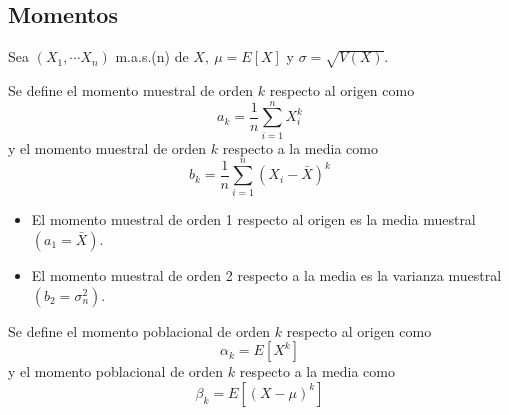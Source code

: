 \subsection{Momentos}

Sea $\left(X_{1}, \cdots X_{n}\right)$ m.a.s.(n) de $X, \ \mu=E[X]$ y
$\sigma=\sqrt{V(X)}$.
\begin{definición}
Se define el momento muestral de orden $k$ respecto al origen como
\[a_{k}=\frac{1}{n} \sum_{i=1}^{n} X_{i}^{k}\]
y el momento muestral de orden $k$ respecto a la media como
\[b_{k}=\frac{1}{n} \sum_{i=1}^{n}\left(X_{i}-\bar{X}\right)^{k}\]
\end{definición}

\begin{observación}
\vspace{-\topsep} %
\vspace{-\topsep} %
\vspace{-\topsep} %
\begin{itemize}
	\item El momento muestral de orden 1 respecto al origen es la media muestral $(a_1 =
		      \bar{X})$.
	\item El momento muestral de orden 2 respecto a la media es la varianza muestral
	      $(b_2 = \sigma_n^2)$.
\end{itemize}
\end{observación}

\begin{definición}
Se define el momento poblacional de orden $k$ respecto al origen como
\[\alpha_{k}=E\left[X^{k}\right]\]
y el momento poblacional de orden $k$ respecto a la media como
\[\beta_{k}=E\left[(X-\mu)^{k}\right]\]
\end{definición}

